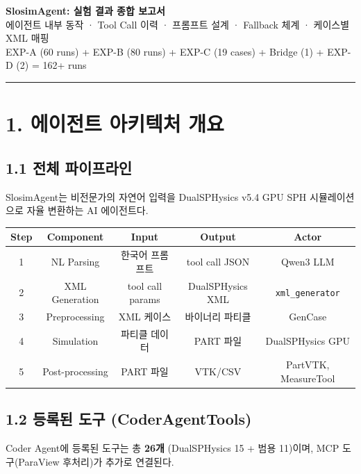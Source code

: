 \documentclass[10pt,a4paper]{article}
\begin{document}
\begin{center}
{\Large\bfseries SlosimAgent: 실험 결과 종합 보고서}\\[0.5em]
{\normalsize 에이전트 내부 동작 · Tool Call 이력 · 프롬프트 설계 · Fallback 체계 · 케이스별 XML 매핑}\\[0.3em]
{\small\color{gray} EXP-A (60 runs) + EXP-B (80 runs) + EXP-C (19 cases) + Bridge (1) + EXP-D (2) = 162+ runs}
\end{center}
\vspace{0.3em}\hrule\vspace{0.8em}

\section{1. 에이전트 아키텍처 개요}

\subsection{1.1 전체 파이프라인}

SlosimAgent는 비전문가의 자연어 입력을 DualSPHysics v5.4 GPU SPH 시뮬레이션으로 자율 변환하는 AI 에이전트다.

\begin{center}
\begin{tabular}{ccccc}
\toprule
\textbf{Step} & \textbf{Component} & \textbf{Input} & \textbf{Output} & \textbf{Actor} \\
\midrule
1 & NL Parsing & 한국어 프롬프트 & tool call JSON & Qwen3 LLM \\
2 & XML Generation & tool call params & DualSPHysics XML & \texttt{xml\_generator} \\
3 & Preprocessing & XML 케이스 & 바이너리 파티클 & GenCase \\
4 & Simulation & 파티클 데이터 & PART 파일 & DualSPHysics GPU \\
5 & Post-processing & PART 파일 & VTK/CSV & PartVTK, MeasureTool \\
\bottomrule
\end{tabular}
\end{center}

\subsection{1.2 등록된 도구 (CoderAgentTools)}

Coder Agent에 등록된 도구는 총 \textbf{26개} (DualSPHysics 15 + 범용 11)이며, MCP 도구(ParaView 후처리)가 추가로 연결된다.
\end{document}
